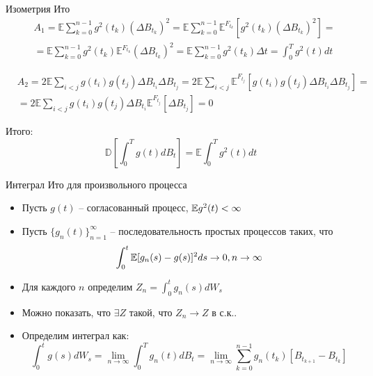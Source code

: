 \documentclass{beamer}
\begin{document}
\begin{frame}{Изометрия Ито}
    \begin{align*}
        &A_1 = \mathbb{E} \sum_{k=0}^{n-1} g^2(t_k) \left(\Delta B_{t_k}\right)^2 = 
        \mathbb{E} \sum_{k=0}^{n-1} \mathbb{E}^{F_{t_k}} \left[g^2(t_k) \left(\Delta B_{t_k}\right)^2 \right] 
        = \\ 
        & = \mathbb{E} \sum_{k=0}^{n-1} g^2(t_k) \mathbb{E}^{F_{t_k}} \left(\Delta B_{t_k}\right)^2 = \mathbb{E} \sum_{k=0}^{n-1} g^2(t_k) \Delta t = \int_0^T g^2(t) dt 
    \end{align*}
     
    \begin{align*}
        &A_2 = 2 \mathbb{E} \sum_{i < j} g(t_i)g(t_j) \Delta B_{t_i} \Delta B_{t_j} =
        2 \mathbb{E} \sum_{i < j} \mathbb{E}^{F_{t_j}} \left[g(t_i)g(t_j) \Delta B_{t_i} \Delta B_{t_j}\right] = \\
        &= 2 \mathbb{E} \sum_{i < j} g(t_i)g(t_j) \Delta B_{t_i} \mathbb{E}^{F_{t_j}} \left[ \Delta B_{t_j}\right] = 0
    \end{align*}
     
    Итого:
    $$ \mathbb{D} \left[ \int_0^T g(t) dB_t \right] = \mathbb{E} \int_0^T g^2(t) dt$$
\end{frame}


\begin{frame}{Интеграл Ито для произвольного процесса}
    \begin{itemize}
        \item Пусть $g(t)$ -- согласованный процесс, $\mathbb{E} g^2(t) < \infty$
        \item Пусть $\{g_n(t)\}_{n=1}^{\infty}$ -- последовательность простых процессов таких, что 
        $$
            \int_0^t \mathbb{E} [g_n(s)-g(s)]^2 ds \to 0, n \to \infty
        $$
        \item Для каждого $n$ определим $Z_n = \int_0^t g_n(s)dW_s$

        \item Можно показать, что $\exists Z$ такой, что $Z_n \to Z$ в с.к.. 
        
        \item Определим интеграл как:
        $$
            \int_0^t g(s)dW_s =  \lim_{n\to \infty}\int_0^T g_n(t) dB_t = \lim_{n \to \infty} \sum_{k=0}^{n-1} g_n(t_k)\left[B_{t_{k+1}} - B_{t_k}\right]
        $$
    \end{itemize}
\end{frame}
\end{document}
